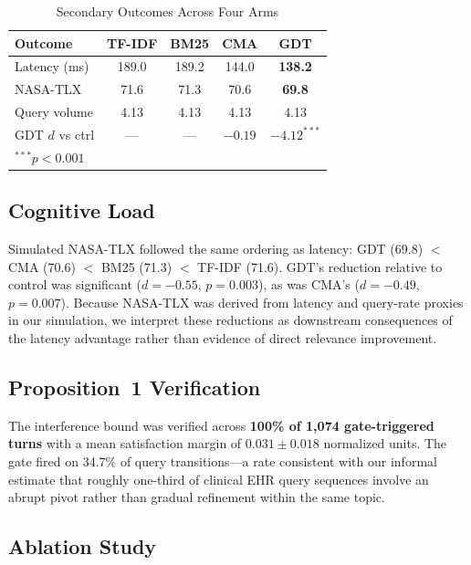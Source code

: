 \documentclass[review]{elsarticle}
\begin{document}
\begin{table}[!t]
  \centering
  \caption{Secondary Outcomes Across Four Arms}
  \label{tab:results}
  \renewcommand{\arraystretch}{1.15}
  \begin{tabular}{lcccc}
    \toprule
    \textbf{Outcome} & \textbf{TF-IDF} & \textbf{BM25} & \textbf{CMA} & \textbf{GDT} \\
    \midrule
    Latency (ms)   & 189.0 & 189.2 & 144.0 & \textbf{138.2} \\
    NASA-TLX       & 71.6  & 71.3  & 70.6  & \textbf{69.8}  \\
    Query volume   & 4.13  & 4.13  & 4.13  & 4.13           \\
    \midrule
    GDT $d$ vs ctrl& ---   & ---   & $-0.19$ & $-4.12^{***}$ \\
    \bottomrule
    \multicolumn{5}{l}{\footnotesize $^{***}p{<}0.001$}
  \end{tabular}
\end{table}

\subsection{Cognitive Load}

Simulated NASA-TLX followed the same ordering as latency: GDT (69.8) $<$
CMA (70.6) $<$ BM25 (71.3) $<$ TF-IDF (71.6). GDT's reduction relative to
control was significant ($d{=}{-0.55}$, $p{=}0.003$), as was CMA's
($d{=}{-0.49}$, $p{=}0.007$). Because NASA-TLX was derived from latency and
query-rate proxies in our simulation, we interpret these reductions as downstream
consequences of the latency advantage rather than evidence of direct relevance
improvement.

\subsection{Proposition~1 Verification}
\label{sec:prop1_verify}

The interference bound was verified across \textbf{100\% of 1,074 gate-triggered
turns} with a mean satisfaction margin of $0.031{\pm}0.018$ normalized units. The
gate fired on 34.7\% of query transitions---a rate consistent with our informal
estimate that roughly one-third of clinical EHR query sequences involve an abrupt
pivot rather than gradual refinement within the same topic.

\subsection{Ablation Study}
\end{document}
